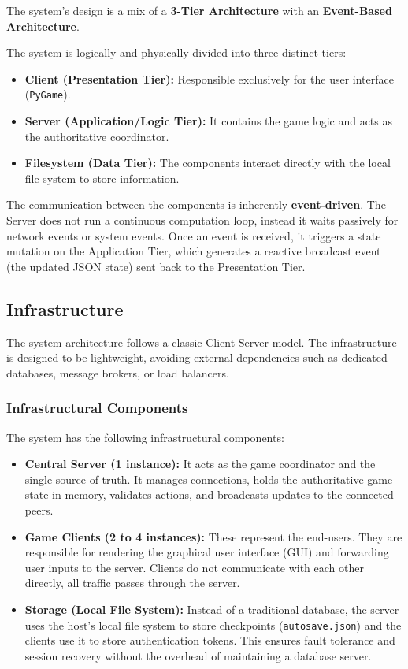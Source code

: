 \documentclass{scrartcl}
\begin{document}
The system's design is a mix of a \textbf{3-Tier Architecture} with an \textbf{Event-Based Architecture}.


The system is logically and physically divided into three distinct tiers:
\begin{itemize}
    \item \textbf{Client (Presentation Tier):} Responsible exclusively for the user interface (\texttt{PyGame}).
    \item \textbf{Server (Application/Logic Tier):} It contains the game logic and acts as the authoritative coordinator.
    \item \textbf{Filesystem (Data Tier):} The components interact directly with the local file system to store information.
\end{itemize}


The communication between the components is inherently \textbf{event-driven}.
The Server does not run a continuous computation loop, instead it waits passively for network events or system events.
Once an event is received, it triggers a state mutation on the Application Tier,
which generates a reactive broadcast event (the updated JSON state) sent back to the Presentation Tier.


\subsection{Infrastructure}\label{infrastructure}

The system architecture follows a classic Client-Server model.
The infrastructure is designed to be lightweight, avoiding external dependencies such as dedicated databases, message brokers, or load balancers.

\subsubsection{Infrastructural Components}
The system has the following infrastructural components:
\begin{itemize}
    \item \textbf{Central Server (1 instance):} It acts as the game coordinator and the single source of truth.
        It manages connections, holds the authoritative game state in-memory, validates actions, and broadcasts updates to the connected peers.
    \item \textbf{Game Clients (2 to 4 instances):} These represent the end-users.
        They are responsible for rendering the graphical user interface (GUI) and forwarding user inputs to the server.
        Clients do not communicate with each other directly, all traffic passes through the server.
    \item \textbf{Storage (Local File System):} Instead of a traditional database, the server uses the host's local file system
        to store checkpoints (\texttt{autosave.json}) and the clients use it to store authentication tokens.
        This ensures fault tolerance and session recovery without the overhead of maintaining a database server.
\end{itemize}
\end{document}

